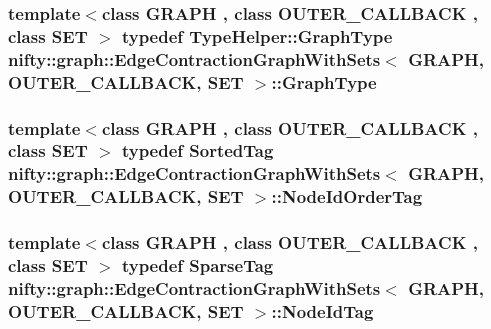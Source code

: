 \subsubsection[{Graph\+Type}]{\setlength{\rightskip}{0pt plus 5cm}template$<$class G\+R\+A\+P\+H , class O\+U\+T\+E\+R\+\_\+\+C\+A\+L\+L\+B\+A\+C\+K , class S\+E\+T $>$ typedef {\bf Type\+Helper\+::\+Graph\+Type} {\bf nifty\+::graph\+::\+Edge\+Contraction\+Graph\+With\+Sets}$<$ G\+R\+A\+P\+H, O\+U\+T\+E\+R\+\_\+\+C\+A\+L\+L\+B\+A\+C\+K, S\+E\+T $>$\+::{\bf Graph\+Type}}\label{classnifty_1_1graph_1_1EdgeContractionGraphWithSets_abadbbebcd10e37a1a3f59bb967accdf0}
\hypertarget{classnifty_1_1graph_1_1EdgeContractionGraphWithSets_aacddf197fc8a2d4268d971bf026323f4}{}
\subsubsection[{Node\+Id\+Order\+Tag}]{\setlength{\rightskip}{0pt plus 5cm}template$<$class G\+R\+A\+P\+H , class O\+U\+T\+E\+R\+\_\+\+C\+A\+L\+L\+B\+A\+C\+K , class S\+E\+T $>$ typedef {\bf Sorted\+Tag} {\bf nifty\+::graph\+::\+Edge\+Contraction\+Graph\+With\+Sets}$<$ G\+R\+A\+P\+H, O\+U\+T\+E\+R\+\_\+\+C\+A\+L\+L\+B\+A\+C\+K, S\+E\+T $>$\+::{\bf Node\+Id\+Order\+Tag}}\label{classnifty_1_1graph_1_1EdgeContractionGraphWithSets_aacddf197fc8a2d4268d971bf026323f4}
\hypertarget{classnifty_1_1graph_1_1EdgeContractionGraphWithSets_a6dbcfb7d4bf82719837d809465f0ac06}{}
\subsubsection[{Node\+Id\+Tag}]{\setlength{\rightskip}{0pt plus 5cm}template$<$class G\+R\+A\+P\+H , class O\+U\+T\+E\+R\+\_\+\+C\+A\+L\+L\+B\+A\+C\+K , class S\+E\+T $>$ typedef {\bf Sparse\+Tag} {\bf nifty\+::graph\+::\+Edge\+Contraction\+Graph\+With\+Sets}$<$ G\+R\+A\+P\+H, O\+U\+T\+E\+R\+\_\+\+C\+A\+L\+L\+B\+A\+C\+K, S\+E\+T $>$\+::{\bf Node\+Id\+Tag}}\label{classnifty_1_1graph_1_1EdgeContractionGraphWithSets_a6dbcfb7d4bf82719837d809465f0ac06}
\hypertarget{classnifty_1_1graph_1_1EdgeContractionGraphWithSets_af9e889455b883d034bf708a0b5b05bee}{}
